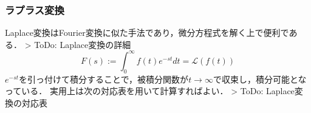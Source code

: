 \subsubsection{ラプラス変換}Laplace変換はFourier変換に似た手法であり，微分方程式を解く上で便利である．
> ToDo: Laplace変換の詳細
$$
F(s):=\int_0^{\infty} f(t) e^{-st} dt=\mathcal{L}(f(t))
$$
$e^{-st}$を引っ付けて積分することで，被積分関数が$t\to \infty$で収束し，積分可能となっている．
実用上は次の対応表を用いて計算すればよい．
> ToDo: Laplace変換の対応表
